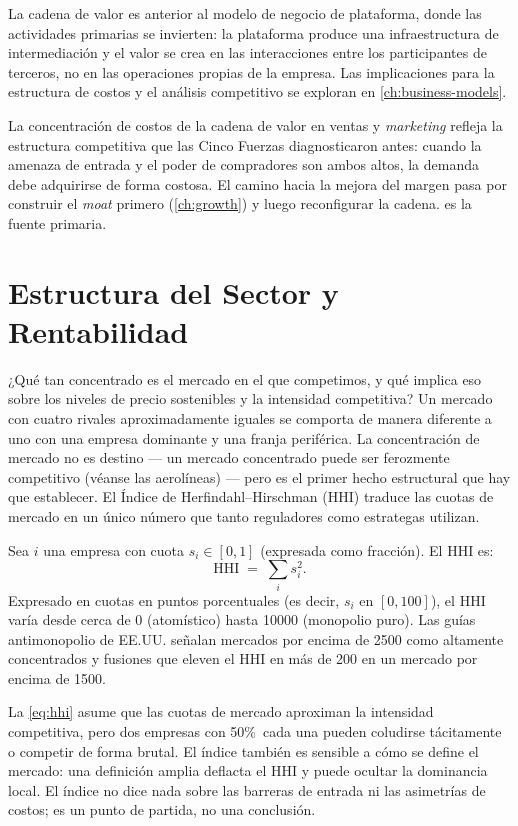 La cadena de valor es anterior al modelo de negocio de plataforma, donde las actividades
primarias se invierten: la plataforma produce una infraestructura de intermediación y el valor
se crea en las interacciones entre los participantes de terceros, no en las operaciones propias
de la empresa. Las implicaciones para la estructura de costos y el análisis competitivo se
exploran en \cref{ch:business-models}.

La concentración de costos de la cadena de valor en ventas y \emph{marketing} refleja la
estructura competitiva que las Cinco Fuerzas diagnosticaron antes: cuando la amenaza de entrada
y el poder de compradores son ambos altos, la demanda debe adquirirse de forma costosa. El
camino hacia la mejora del margen pasa por construir el \emph{moat} primero (\cref{ch:growth})
y luego reconfigurar la cadena. \textcite{porter1985} es la fuente primaria.

\section{Estructura del Sector y Rentabilidad}\label{sec:industry-structure}

¿Qué tan concentrado es el mercado en el que competimos, y qué implica eso sobre los niveles
de precio sostenibles y la intensidad competitiva? Un mercado con cuatro rivales aproximadamente
iguales se comporta de manera diferente a uno con una empresa dominante y una franja periférica.
La concentración de mercado no es destino --- un mercado concentrado puede ser ferozmente
competitivo (véanse las aerolíneas) --- pero es el primer hecho estructural que hay que
establecer. El Índice de Herfindahl--Hirschman (HHI) traduce las cuotas de mercado en un
único número que tanto reguladores como estrategas utilizan.

Sea \(i\) una empresa con cuota \(s_i \in [0,1]\) (expresada como fracción). El HHI es:
\begin{equation}\label{eq:hhi}
  \mathrm{HHI} \;=\; \sum_{i} s_i^2.
\end{equation}
Expresado en cuotas en puntos porcentuales (es decir, \(s_i\) en \([0,100]\)), el HHI varía
desde cerca de 0 (atomístico) hasta \num{10000} (monopolio puro). Las guías antimonopolio
de EE.UU. \parencite{dranove7theconomics} señalan mercados por encima de \num{2500} como
altamente concentrados y fusiones que eleven el HHI en más de \num{200} en un mercado por
encima de \num{1500}.

La \cref{eq:hhi} asume que las cuotas de mercado aproximan la intensidad competitiva, pero dos
empresas con 50\%\ cada una pueden coludirse tácitamente o competir de forma brutal. El índice
también es sensible a cómo se define el mercado: una definición amplia deflacta el HHI y puede
ocultar la dominancia local. El índice no dice nada sobre las barreras de entrada ni las
asimetrías de costos; es un punto de partida, no una conclusión.

